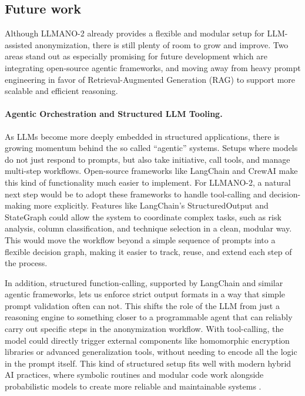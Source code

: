 \documentclass{article}
\begin{document}
\subsection{Future work}

Although LLMANO-2 already provides a flexible and modular setup for LLM-assisted anonymization, there is still plenty of room to grow and improve. Two areas stand out as especially promising for future development which are integrating open-source agentic frameworks, and moving away from heavy prompt engineering in favor of Retrieval-Augmented Generation (RAG) to support more scalable and efficient reasoning.

\paragraph{Agentic Orchestration and Structured LLM Tooling.}
As LLMs become more deeply embedded in structured applications, there is growing momentum behind the so called “agentic” systems. Setups where models do not just respond to prompts, but also take initiative, call tools, and manage multi-step workflows. Open-source frameworks like LangChain and CrewAI make this kind of functionality much easier to implement. For LLMANO-2, a natural next step would be to adopt these frameworks to handle tool-calling and decision-making more explicitly. Features like LangChain’s StructuredOutput and StateGraph could allow the system to coordinate complex tasks, such as risk analysis, column classification, and technique selection in a clean, modular way. This would move the workflow beyond a simple sequence of prompts into a flexible decision graph, making it easier to track, reuse, and extend each step of the process.

In addition, structured function-calling, supported by LangChain and similar agentic frameworks, lets us enforce strict output formats in a way that simple prompt validation often can not. This shifts the role of the LLM from just a reasoning engine to something closer to a programmable agent that can reliably carry out specific steps in the anonymization workflow. With tool-calling, the model could directly trigger external components like homomorphic encryption libraries or advanced generalization tools, without needing to encode all the logic in the prompt itself. This kind of structured setup fits well with modern hybrid AI practices, where symbolic routines and modular code work alongside probabilistic models to create more reliable and maintainable systems \cite{jarvix}.
\end{document}
